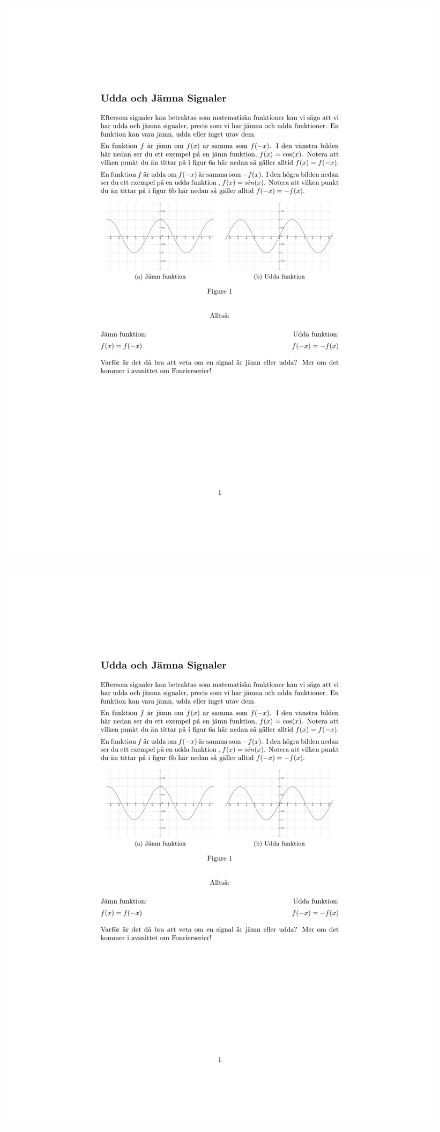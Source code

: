 \documentclass[12pt,a4paper,twoside,openright]{article}
\begin{document}
\begin{figure}
  \centerline{\includegraphics[page=3]{Bilagor/Bilaga3}}
\end{figure}
\begin{figure}
  \centerline{\includegraphics[page=4]{Bilagor/Bilaga3}}
\end{figure}
\end{document}
